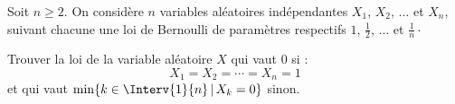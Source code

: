 \documentclass[a4paper,10pt]{report}
\begin{document}
\begin{enumerate}
\begin{enumerate}
\end{enumerate}




%
%
%
%
\end{enumerate}

\begin{Exa} Soit $n \geq 2$. On considère $n$ variables aléatoires indépendantes $X_1$, $X_2$, $\ldots$ et $X_n$, suivant chacune une loi de Bernoulli de paramètres respectifs $1$, $\tfrac{1}{2}$, $\ldots$ et $\tfrac{1}{n}\cdot$

\noindent Trouver la loi de la variable aléatoire $X$ qui vaut $0$ si :
$$ X_1= X_2= \cdots = X_n = 1$$
et qui vaut $\min \lbrace k \in \Interv{1}{n} \, \vert \, X_k =0 \rbrace$ sinon.
\end{Exa} 
\end{document}
